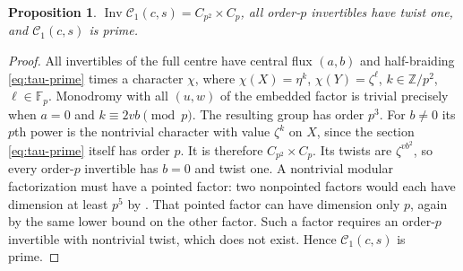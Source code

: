 \documentclass[11pt]{amsart}
\newtheorem{proposition}[theorem]{Proposition}
\theoremstyle{definition}\newtheorem{definition}[theorem]{Definition}
\newcommand{\Fp}{\mathbb F_p}
\newcommand{\Inv}{\operatorname{Inv}}
\newcommand{\cC}{\mathcal C}
\begin{document}
\begin{proposition}\label{prop:prime}
$\Inv\cC_1(c,s)=C_{p^2}\times C_p$, all order-$p$ invertibles have twist one,
and $\cC_1(c,s)$ is prime.
\end{proposition}
\begin{proof}
All invertibles of the full centre have central flux $(a,b)$ and half-braiding
\eqref{eq:tau-prime} times a character $\chi$, where
$\chi(X)=\eta^k$, $\chi(Y)=\zeta^\ell$,
$k\in\mathbb Z/p^2$, $\ell\in\Fp$.
Monodromy with all $(u,w)$ of the embedded factor is trivial precisely when
$a=0$ and $k\equiv2vb\pmod p$.
The resulting group has order $p^3$. For $b\ne0$ its $p$th power is the
nontrivial character with value $\zeta^k$ on $X$, since the section
\eqref{eq:tau-prime} itself has order $p$. It is therefore $C_{p^2}\times C_p$.
Its twists are $\zeta^{vb^2}$, so every order-$p$ invertible has $b=0$ and
twist one.
A nontrivial modular factorization must have a pointed factor: two nonpointed
factors would each have dimension at least $p^5$ by \cite{CPS}. That pointed
factor can have dimension only $p$, again by the same lower bound on the other
factor. Such a factor requires an order-$p$ invertible with nontrivial twist,
which does not exist. Hence $\cC_1(c,s)$ is prime.
\end{proof}
\end{document}
